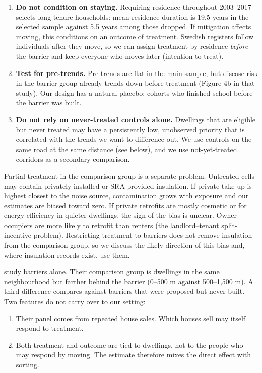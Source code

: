 \documentclass[11pt]{article}
\begin{document}
\begin{enumerate}
\item \textbf{Do not condition on staying.} Requiring residence throughout 2003--2017 selects long-tenure households: mean residence duration is 19.5 years in the selected sample against 5.5 years among those dropped. If mitigation affects moving, this conditions on an outcome of treatment. Swedish registers follow individuals after they move, so we can assign treatment by residence \emph{before} the barrier and keep everyone who moves later (intention to treat).
\item \textbf{Test for pre-trends.} Pre-trends are flat in the main sample, but disease risk in the barrier group already trends down before treatment (Figure 4b in that study). Our design has a natural placebo: cohorts who finished school before the barrier was built.
\item \textbf{Do not rely on never-treated controls alone.} Dwellings that are eligible but never treated may have a persistently low, unobserved priority that is correlated with the trends we want to difference out. We use controls on the same road at the same distance (see below), and we use not-yet-treated corridors as a secondary comparison.
\end{enumerate}

Partial treatment in the comparison group is a separate problem. Untreated cells may contain privately installed or SRA-provided insulation. If private take-up is highest closest to the noise source, contamination grows with exposure and our estimates are biased toward zero. If private retrofits are mostly cosmetic or for energy efficiency in quieter dwellings, the sign of the bias is unclear. Owner-occupiers are more likely to retrofit than renters (the landlord--tenant split-incentive problem). Restricting treatment to barriers does not remove insulation from the comparison group, so we discuss the likely direction of this bias and, where insulation records exist, use them.

\textbf{\textcite{morettiTrafficNoiseExternality2025}} study barriers alone. Their comparison group is dwellings in the same neighbourhood but farther behind the barrier (0--500 m against 500--1,500 m). A third difference compares against barriers that were proposed but never built. Two features do not carry over to our setting:

\begin{enumerate}
\item Their panel comes from repeated house sales. Which houses sell may itself respond to treatment.
\item Both treatment and outcome are tied to dwellings, not to the people who may respond by moving. The estimate therefore mixes the direct effect with sorting.
\end{enumerate}
\end{document}
